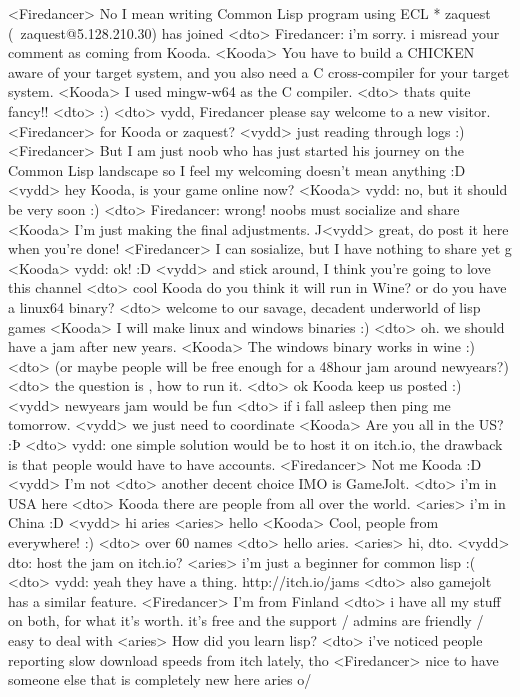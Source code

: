 \documentclass[a4paper,11pt]{article}
\begin{document}
<Firedancer> No I mean writing Common Lisp program using ECL
* zaquest (~zaquest@5.128.210.30) has joined
<dto> Firedancer: i'm sorry. i misread your comment as coming from Kooda.
<Kooda> You have to build a CHICKEN aware of your target system, and you also need a C cross-compiler for your target system.
<Kooda> I used mingw-w64 as the C compiler.
<dto> thats quite fancy!!
<dto> :)
<dto> vydd, Firedancer please say welcome to a new visitor.
<Firedancer> for Kooda or zaquest?
<vydd> just reading through logs :)
<Firedancer> But I am just noob who has just started his journey on the Common Lisp landscape so I feel my welcoming doesn't mean anything :D
<vydd> hey Kooda, is your game online now?
<Kooda> vydd: no, but it should be very soon :)
<dto> Firedancer: wrong! noobs must socialize and share
<Kooda> I’m just making the final adjustments. ^^
<vydd> great, do post it here when you're done!
<Firedancer> I can sosialize, but I have nothing to share yet ^^'
<Kooda> vydd: ok! :D
<vydd> and stick around, I think you're going to love this channel
<dto> cool Kooda do you think it will run in Wine? or do you have a linux64 binary?
<dto> welcome to our savage, decadent underworld of lisp games
<Kooda> I will make linux and windows binaries :)
<dto> oh. we should have a jam after new years.
<Kooda> The windows binary works in wine :)
<dto> (or maybe people will be free enough for a 48hour jam around newyears?)
<dto> the question is , how to run it.
<dto> ok Kooda keep us posted :)
<vydd> newyears jam would be fun
<dto> if i fall asleep then ping me tomorrow.
<vydd> we just need to coordinate
<Kooda> Are you all in the US? :Þ
<dto> vydd: one simple solution would be to host it on itch.io, the drawback is that people would have to have accounts.
<Firedancer> Not me Kooda :D
<vydd> I'm not
<dto> another decent choice IMO is GameJolt.
<dto> i'm in USA here
<dto> Kooda there are people from all over the world.
<aries> i'm in China :D
<vydd> hi aries
<aries> hello
<Kooda> Cool, people from everywhere! :)
<dto> over 60 names
<dto> hello aries.
<aries> hi, dto.
<vydd> dto: host the jam on itch.io?
<aries> i'm just a beginner for common lisp :(
<dto> vydd: yeah they have a thing. http://itch.io/jams
<dto> also gamejolt has a similar feature.
<Firedancer> I'm from Finland
<dto> i have all my stuff on both, for what it's worth. it's free and the support / admins are friendly / easy to deal with
<aries> How did you learn lisp?
<dto> i've noticed people reporting slow download speeds from itch lately, tho
<Firedancer> nice to have someone else that is completely new here aries o/
\end{document}
